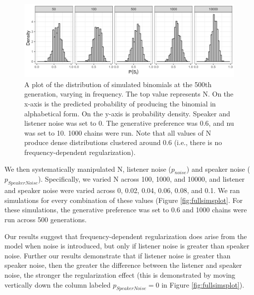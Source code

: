 \documentclass[10pt, letterpaper]{article}
\newenvironment{CodeChunk}{}{}
\begin{document}
\begin{CodeChunk}
\begin{figure}[tb]

{\centering \includegraphics[width=1\linewidth]{Figures/noNoise} 

}

\caption[A plot of the distribution of simulated binomials at the 500th generation, varying in frequency]{A plot of the distribution of simulated binomials at the 500th generation, varying in frequency. The top value represents N. On the x-axis is the predicted probability of producing the binomial in alphabetical form. On the y-axis is probability density. Speaker and listener noise was set to 0. The generative preference was 0.6, and nu was set to 10. 1000 chains were run. Note that all values of N produce dense distributions clustered around 0.6 (i.e., there is no frequency-dependent regularization).}\label{fig:noNoisePlot}
\end{figure}
\end{CodeChunk}

We then systematically manipulated N, listener noise (\(p_{noise}\)) and
speaker noise (\(p_{SpeakerNoise}\)). Specifically, we varied N across
100, 1000, and 10000, and listener and speaker noise were varied across
0, 0.02, 0.04, 0.06, 0.08, and 0.1. We ran simulations for every
combination of these values (Figure \ref{fig:fullsimsplot}. For these
simulations, the generative preference was set to 0.6 and 1000 chains
were run across 500 generations.

Our results suggest that frequency-dependent regularization does arise
from the model when noise is introduced, but only if listener noise is
greater than speaker noise. Further our results demonstrate that if
listener noise is greater than speaker noise, then the greater the
difference between the listener and speaker noise, the stronger the
regularization effect (this is demonstrated by moving vertically down
the column labeled \(p_{SpeakerNoise} = 0\) in Figure
\ref{fig:fullsimsplot}).
\end{document}
